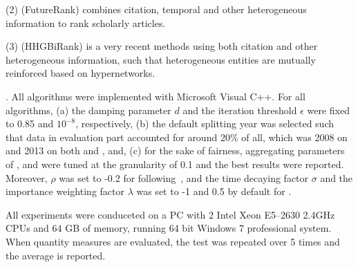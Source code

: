 \noindent
(2) \futurerank (FutureRank) combines citation, temporal and other heterogeneous information to rank scholarly articles.

\noindent
(3) \hhgrank (HHGBiRank) is a very recent methods using both citation and other heterogeneous information, such that heterogeneous entities are mutually reinforced based on hypernetworks.


.
All algorithms were implemented with Microsoft Visual C++.
For all algorithms, (a) the damping parameter $d$ and the iteration threshold $\epsilon$ were fixed to 0.85 and $10^{-8}$, respectively,
(b) the default splitting year was selected such that data in evaluation part accounted for around 20\% of all, which was 2008 on \aan and 2013 on both \aminer and \magdata, and,
(c) for the sake of fairness, aggregating parameters of \futurerank, \hhgrank and \ensemblerank were tuned at the granularity of 0.1 and the best results were reported.
%
Moreover, $\rho$ was set to -0.2 for \futurerank following~\cite{sayyadi09}, and the time decaying factor $\sigma$ and the importance weighting factor $\lambda$ was set to -1 and 0.5  by default for \ensemblerank.

All experiments were conduceted on a PC with 2 Intel Xeon E5--2630 2.4GHz CPUs and 64 GB of memory, running 64 bit Windows 7 professional system. %
When quantity measures are evaluated, the test was repeated over 5 times and the average is reported.


